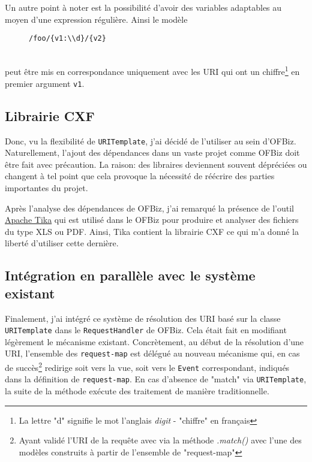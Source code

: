 Un autre point à noter est la possibilité d'avoir des variables adaptables au moyen d'une expression régulière. Ainsi le modèle 
\begin{figure}[h!]
	\begin{lstlisting}[frame=leftline]
/foo/{v1:\\d}/{v2} 
	\end{lstlisting}
\end{figure}\\
peut être mis en correspondance uniquement avec les URI qui ont un chiffre\footnote{La lettre "d" signifie le mot l'anglais \emph{digit} - "chiffre" en français} en premier argument \verb|v1|.
\subsection{Librairie CXF}
Donc, vu la flexibilité de \verb|URITemplate|, j'ai décidé de l'utiliser au sein d'OFBiz.
Naturellement, l'ajout des dépendances dans un vaste projet comme OFBiz doit être fait avec précaution. La raison: des libraires deviennent souvent dépréciées ou changent à tel point que cela provoque la nécessité de réécrire des parties importantes du projet.  

Après l'analyse des dépendances de OFBiz, j'ai remarqué la présence  de l'outil \href{https://tika.apache.org/}{Apache Tika} qui est utilisé dans le OFBiz pour produire et analyser des fichiers du type XLS ou PDF. Ainsi, Tika contient la librairie CXF ce qui m'a donné la liberté d'utiliser cette dernière. 

\subsection{Intégration en parallèle avec le système existant}
Finalement, j'ai intégré ce système de résolution des URI basé sur la classe \verb|URITemplate| dans le \verb|RequestHandler| de OFBiz. Cela était fait en modifiant légèrement le mécanisme existant. Concrètement, au début de la résolution d'une URI, l'ensemble des \verb|request-map| est délégué au nouveau mécanisme qui, en cas de succès\footnote{ Ayant validé l'URI de la requête avec via la méthode \emph{.match()} avec l'une des modèles construits à partir de l'ensemble de  "request-map"} redirige soit vers la vue, soit vers le \verb|Event| correspondant, indiqués dans la définition de \verb|request-map|. En cas d'absence de "match" via \verb|URITemplate|, la suite de la méthode exécute des traitement de manière traditionnelle.  


